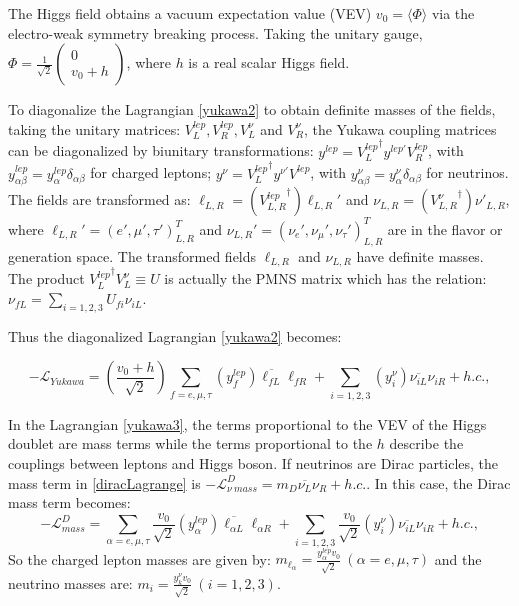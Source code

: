 The Higgs field obtains a vacuum expectation value (VEV) $v_0=\langle\Phi\rangle$ via the electro-weak symmetry breaking process. Taking the unitary gauge, $\Phi=\frac{1}{\sqrt 2}\begin{pmatrix}0\\v_0+h \end{pmatrix}$, where $h$ is a real scalar Higgs field. 

To diagonalize the Lagrangian \ref{yukawa2} to obtain definite masses of the fields, taking the unitary matrices: $V^{lep}_L, V^{lep}_R,V^\nu_L$ and $V^\nu_R$, the Yukawa coupling matrices can be diagonalized by biunitary transformations: $y^{lep}={V^{lep}_L}^\dagger y^{lep'}V^{lep}_R$, with $y^{lep}_{\alpha\beta}=y^{lep}_\alpha\delta_{\alpha\beta}$ for charged leptons; $y^{\nu}={V^{lep}_L}^\dagger y^{\nu'}V^{lep}$, with $y^{\nu}_{\alpha\beta}=y^{\nu}_\alpha\delta_{\alpha\beta}$ for neutrinos. The fields are transformed as: $\ell_{L,R}=({V^{lep}_{L,R}}^\dagger) \ell_{L,R}'$ and
$\nu_{L,R}=({V^\nu_{L,R}}^\dagger)\nu'_{L,R}$, where $\ell_{L,R}'=(e',\mu',\tau')_{L,R}^T$ and ${\nu}_{L,R}'=(\nu_e',\nu_\mu',\nu_{\tau}')_{L,R}^T$ are in the flavor or generation space. The transformed fields $\ell_{L,R}$ and $\nu_{L,R}$ have definite masses. The product ${V_L^{lep}}^\dagger V_L^\nu\equiv U$ is actually the PMNS matrix which has the relation: $\nu_{fL} = \sum_{i=1,2,3}U_{fi}\nu_{iL}$\cite{funchal2013physics,lesgourgues2013neutrino}.

Thus the diagonalized Lagrangian \ref{yukawa2} becomes\cite{funchal2013physics}:

\begin{equation}\label{yukawa3}
-\mathcal{L}_{Yukawa} = (\frac{v_0+h}{\sqrt 2})\sum_{f=e,\mu,\tau}(y_f^{lep})\overline{\ell_{fL}} \ell_{fR}+\sum_{i=1,2,3}(y_i^{\nu})\overline{\nu_{iL}}\nu_{iR}+h.c.,
\end{equation}

In the Lagrangian \ref{yukawa3}, the terms proportional to the VEV of the Higgs doublet are mass terms while the terms proportional to the $h$ describe the couplings between leptons and Higgs boson\cite{giunti2007fundamentals}. If neutrinos are Dirac particles, the mass term in \ref{diracLagrange} is $-\mathcal L_{\nu~mass}^D = m_D\overline{\nu_L}\nu_R+h.c.$. In this case, the Dirac mass term becomes:
\begin{equation}\label{eq:diracMass}
-\mathcal L^D_{mass} =\sum_{\alpha=e,\mu,\tau}\frac{v_0}{\sqrt{2}}(y_\alpha^{lep})\overline{\ell_{\alpha L}}\ell_{\alpha R}+\sum_{i=1,2,3}\frac{v_0}{\sqrt{2}}(y_{i}^\nu)\overline{\nu_{iL}}\nu_{iR}+h.c.,
\end{equation}
So the charged lepton masses are given by: $m_{\ell_\alpha}=\frac{y_\alpha^{lep} v_0}{\sqrt 2}~(\alpha=e,\mu,\tau)$ and the neutrino masses are: $m_i=\frac{y_k^\nu v_0}{\sqrt 2}~(i=1,2,3)$\cite{funchal2013physics}. 

